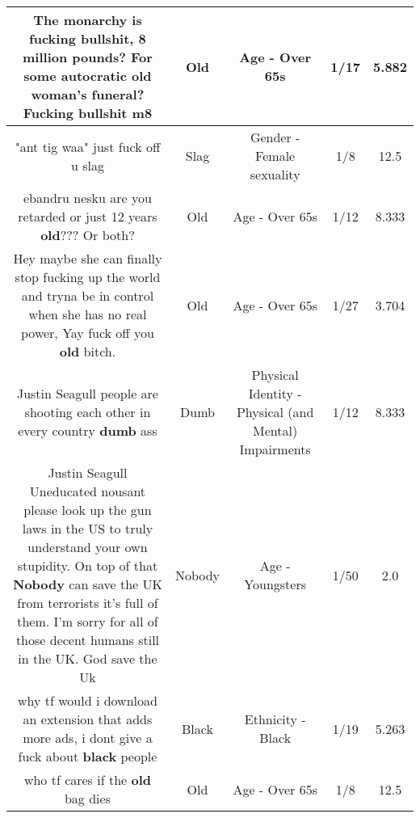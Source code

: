 \documentclass[11pt]{article}
\newlength\mylength
\begin{document}
\begin{center}
\begin{longtable}{|C{.65\mylength}|C{.30\mylength}|C{.12\mylength}|C{.12\mylength}|C{.12\mylength}|}
  \small The monarchy is fucking bullshit, 8 million pounds? For some autocratic \textbf{old} woman's funeral? Fucking bullshit m8\normalsize   & Old & Age - Over 65s & 1/17 & 5.882 \\  \hline
  \small "ant tig waa" just fuck off u slag\normalsize   & Slag & Gender - Female sexuality & 1/8 & 12.5 \\  \hline
  \small ebandru nesku are you retarded or just 12 years \textbf{old}??? Or both?\normalsize   & Old & Age - Over 65s & 1/12 & 8.333 \\  \hline
  \small Hey maybe she can finally stop fucking up the world and tryna be in control when she has no real power, Yay fuck off you \textbf{old} bitch.\normalsize   & Old & Age - Over 65s & 1/27 & 3.704 \\  \hline
  \small Justin Seagull people are shooting each other in every country \textbf{dumb} ass\normalsize   & Dumb & Physical Identity - Physical (and Mental) Impairments & 1/12 & 8.333 \\  \hline
  \small Justin Seagull Uneducated nousant please look up the gun laws in the US to truly understand your own stupidity. On top of that \textbf{Nobody} can save the UK from terrorists it's full of them. I'm sorry for all of those decent humans still in the UK. God save the Uk\normalsize   & Nobody & Age - Youngsters & 1/50 & 2.0 \\  \hline
  \small why tf would i download an extension that adds more ads, i dont give a fuck about \textbf{black} people\normalsize   & Black & Ethnicity - Black & 1/19 & 5.263 \\  \hline
  \small who tf cares if the \textbf{old} bag dies\normalsize   & Old & Age - Over 65s & 1/8 & 12.5 \\  \hline

\end{longtable}
\end{center}
\end{document}

